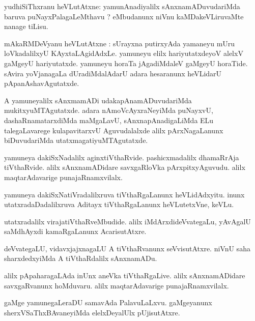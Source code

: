 \documentclass{article}
\begin{document}
\begin{mn}
yudhiSiThxranu heVLutAtxne: yamunAnadiyalilx sAnxnamADuvudariMda baruva puNayxPalagaLeMthavu ?
eMbudanunx niVnu kaMDakeVLiruvaMte nanage tiLisu.
\end{mn}

\begin{mn}
mAkaRMDeVyanu heVLutAtxne : sUrayxna putirxyAda yamaneyu mUru loVkadalilxyU KAyxtaLAgidAdxLe.
yamuneyu elilx hariyutatxdeyoV alelxV gaMgeyU hariyutatxde. yamuneyu horaTa jAgadiMdaleV gaMgeyU  
horaTide. sAvira yoVjanagaLa dUradiMdalAdarU adara hesaranunx heVLidarU pApanAshavAgutatxde.
\end{mn}

\begin{mn}
A yamuneyalilx sAnxmamADi udakapAnamADuvudariMda mukitxyuMTAgutatxde. adara nAmoVcAyxraNeyiMda 
puNayxvU, dashaRnamatarxdiMda maMgaLavU, sAnxnapAnadigaLiMda ELu talegaLavarege kulapavitarxvU 
Aguvudalalxde alilx pArxNagaLanunx biDuvudariMda utatxmagatiyuMTAgutatxde.
\end{mn}

\begin{mn}
yamuneya dakiSxNadalilx aginxtiVthaRvide. pashicxmadalilx  dhamaRrAja tiVthaRvide. alilx 
sAnxnamADidare savxgaRloVka pArxpitxyAguvudu. alilx maqtarAdavarige punajaRnamxvilalx.
\end{mn}

\begin{mn}
yamuneya dakiSxNatiVradalilxruva  tiVthaRgaLanunx heVLidAdxyitu. inunx utatxradaDadalilxruva 
Aditayx tiVthaRgaLanunx heVLutetxVne, keVLu.
\end{mn}

\begin{mn}
utatxradalilx virajatiVthaRveMbudide. alilx iMdArxdideVvategaLu, yAvAgalU saMdhAyxdi 
kamaRgaLanunx AcarisutAtxre.
\end{mn}

\begin{mn}
deVvategaLU, vidavxjajxnagaLU A tiVthaRvanunx seVvisutAtxre. niVnU saha sharxdedxyiMda A 
tiVthaRdalilx sAnxnamADu.
\end{mn}

\begin{mn}
alilx pApaharagaLAda inUnx aneVka tiVthaRgaLive. alilx sAnxnamADidare savxgaRvanunx hoMduvaru. 
alilx maqtarAdavarige punajaRnamxvilalx.
\end{mn}

\begin{mn}
gaMge yamunegaLeraDU samavAda PalavuLaLxvu. gaMgeyanunx sherxVSaThxBAvaneyiMda elelxDeyalUlx 
pUjisutAtxre.
\end{mn}
\end{document}
